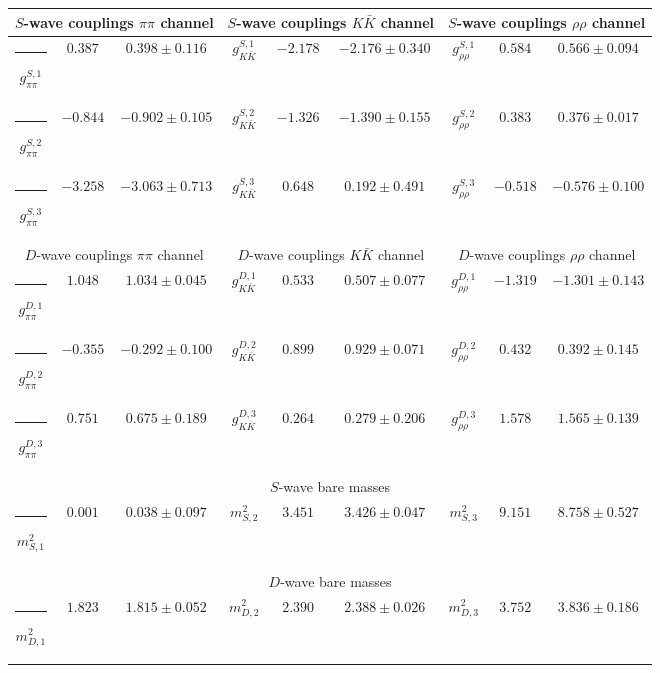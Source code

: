 \begin{table}[h]
\begin{ruledtabular}
\begin{tabular}{c c c c c c c c c}
\multicolumn{3}{c}{$S$-wave couplings $\pi \pi$ channel}  & \multicolumn{3}{c}{$S$-wave couplings $K  \bar K$ channel} & \multicolumn{3}{c}{$S$-wave couplings $\rho\rho$ channel} \\ \hline
\rule[-0.2cm]{-0.1cm}{.55cm} $g^{S,1}_{\pi\pi}$ & $0.387$ & $0.398 \pm 0.116$ & $g^{S,1}_{K\bar K}$ & $-2.178$ & $-2.176 \pm 0.340$ & $g^{S,1}_{\rho\rho}$ & $0.584$ & $0.566 \pm 0.094$ \\
\rule[-0.2cm]{-0.1cm}{.55cm} $g^{S,2}_{\pi\pi}$ & $-0.844$ & $-0.902 \pm 0.105$ & $g^{S,2}_{K\bar K}$ & $-1.326$ & $-1.390 \pm 0.155$ & $g^{S,2}_{\rho\rho}$ & $0.383$ & $0.376 \pm 0.017$ \\
\rule[-0.2cm]{-0.1cm}{.55cm} $g^{S,3}_{\pi\pi}$ & $-3.258$ & $-3.063 \pm 0.713$ & $g^{S,3}_{K\bar K}$ & $0.648$ & $0.192 \pm 0.491$ & $g^{S,3}_{\rho\rho}$ & $-0.518$ & $-0.576 \pm 0.100$ \\
\hline 
\multicolumn{3}{c}{$D$-wave couplings $\pi \pi$ channel}  & \multicolumn{3}{c}{$D$-wave couplings $K  \bar K$ channel} & \multicolumn{3}{c}{$D$-wave couplings $\rho\rho$ channel} \\ \hline
\rule[-0.2cm]{-0.1cm}{.55cm} $g^{D,1}_{\pi\pi}$ & $1.048$ & $1.034 \pm 0.045$ & $g^{D,1}_{K\bar K}$ & $0.533$ & $0.507 \pm 0.077$ & $g^{D,1}_{\rho\rho}$ & $-1.319$ & $-1.301 \pm 0.143$ \\
\rule[-0.2cm]{-0.1cm}{.55cm} $g^{D,2}_{\pi\pi}$ & $-0.355$ & $-0.292 \pm 0.100$ & $g^{D,2}_{K\bar K}$ & $0.899$ & $0.929 \pm 0.071$ & $g^{D,2}_{\rho\rho}$ & $0.432$ & $0.392 \pm 0.145$ \\
\rule[-0.2cm]{-0.1cm}{.55cm} $g^{D,3}_{\pi\pi}$ & $0.751$ & $0.675 \pm 0.189$ & $g^{D,3}_{K\bar K}$ & $0.264$ & $0.279 \pm 0.206$ & $g^{D,3}_{\rho\rho}$ & $1.578$ & $1.565 \pm 0.139$ \\
\hline 
\multicolumn{9}{c}{$S$-wave bare masses}   \\ \hline
\rule[-0.2cm]{-0.1cm}{.55cm} $m^2_{S,1}$ & $0.001$ & $0.038 \pm 0.097$ & $m^2_{S,2}$ & $3.451$ & $3.426 \pm 0.047$ & $m^2_{S,3}$ & $9.151$ & $8.758 \pm 0.527$ \\
\hline 
\multicolumn{9}{c}{$D$-wave bare masses}   \\ \hline
\rule[-0.2cm]{-0.1cm}{.55cm} $m^2_{D,1}$ & $1.823$ & $1.815 \pm 0.052$ & $m^2_{D,2}$ & $2.390$ & $2.388 \pm 0.026$ & $m^2_{D,3}$ & $3.752$ & $3.836 \pm 0.186$ \\

\end{tabular}
\end{ruledtabular}
\end{table}
